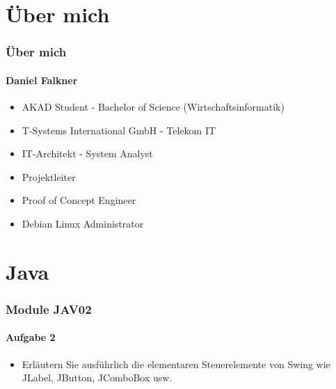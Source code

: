 \documentclass[xcolor=dvipsnames]{beamer}
\subtitle{Modul JAV02} %
\institute{AKAD University} %
\title{\Title}
\author{\Author}
\date{05/06.September.2014}
\begin{document}
\begin{frame}
    \titlepage
\end{frame}




\section{Über mich}
\begin{frame} %
  \frametitle{Über mich} %
  \framesubtitle{Daniel Falkner} %
  \begin{block}{}
	  \begin{itemize}
	  	\item AKAD Student - Bachelor of Science (Wirtschaftsinformatik)
  		\item T-Systems International GmbH - Telekom IT
  		\item IT-Architekt - System Analyst
		\item Projektleiter
		\item Proof of Concept Engineer
  		\item Debian Linux Administrator
	  \end{itemize}
  \end{block}
\end{frame}


\section{Java}
\begin{frame} %
  \frametitle{Module JAV02} %
  \framesubtitle{Aufgabe 2} %
  \begin{block}{}
	  \begin{itemize}
		\item Erläutern Sie ausführlich die elementaren Steuerelemente von Swing wie JLabel, JButton, JComboBox usw.
	  \end{itemize}

  \end{block}
\end{frame}
\end{document}
